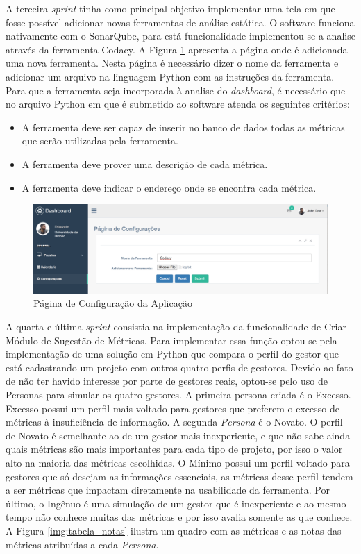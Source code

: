 A terceira \textit{sprint} tinha como principal objetivo implementar uma tela em que fosse possível adicionar novas ferramentas de análise estática. O software funciona nativamente com o SonarQube, para está funcionalidade implementou-se a analise através da ferramenta Codacy. A Figura \ref{pag_conf} apresenta a página onde é adicionada uma nova ferramenta. Nesta página é necessário dizer o nome da ferramenta e adicionar um arquivo na linguagem Python com as instruções da ferramenta. Para que a ferramenta seja incorporada à analise do \textit{dashboard}, é necessário que no arquivo Python em que é submetido ao software atenda os seguintes critérios:

\begin{itemize}
\item A ferramenta deve ser capaz de inserir no banco de dados todas as métricas que serão utilizadas pela ferramenta.
\item A ferramenta deve prover uma descrição de cada métrica.
\item A ferramenta deve indicar o endereço onde se encontra cada métrica.
\end{itemize} 

\graphicspath{{figuras/}}
\begin{figure}[h]
\centering
\includegraphics[scale=0.40]{pagina_configuracao.png}
\caption{Página de Configuração da Aplicação}
\label{pag_conf}
\end{figure}


A quarta e última \textit{sprint} consistia na implementação da funcionalidade de Criar Módulo de Sugestão de Métricas. Para implementar essa função optou-se pela implementação de uma solução em Python que compara o perfil do gestor que está cadastrando um projeto com outros quatro perfis de gestores. Devido ao fato de não ter havido interesse por parte de gestores reais, optou-se pelo uso de Personas para simular os quatro gestores. A primeira persona criada é o Excesso. Excesso possui um perfil mais voltado para gestores que preferem o excesso de métricas à insuficiência de informação. A segunda \textit{Persona} é o Novato. O perfil de Novato é semelhante ao de um gestor mais inexperiente, e que não sabe ainda quais métricas são mais importantes para cada tipo de projeto, por isso o valor alto na maioria das métricas escolhidas. O Mínimo possui um perfil voltado para gestores que só desejam as informações essenciais, as métricas desse perfil tendem a ser métricas que impactam diretamente na usabilidade da ferramenta. Por último, o Ingênuo é uma simulação de um gestor que é inexperiente e ao mesmo tempo não conhece muitas das métricas e por isso avalia somente as que conhece. A Figura \ref{img:tabela_notas} ilustra um quadro com as métricas e as notas das métricas atribuídas a cada \textit{Persona}. 



